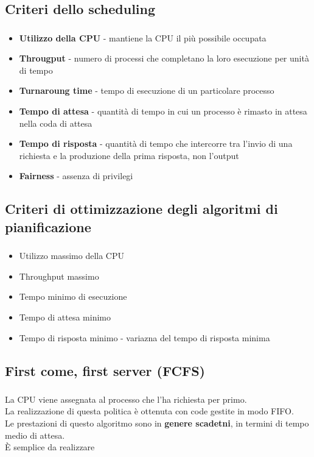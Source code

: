 \documentclass{beamer}
\newenvironment{mainframe}{
	\begin{frame}
		\frametitle{\insertsubsection}
		\framesubtitle{\insertsection}
	}{
	\end{frame}
}
\begin{document}
\subsection{Criteri dello scheduling}
\begin{mainframe}
	\begin{itemize}
		\item \textbf{Utilizzo della CPU} - mantiene la CPU il più possibile occupata
		\item \textbf{Througput} - numero di processi che completano la loro esecuzione per unità di tempo
		\item \textbf{Turnaroung time} - tempo di esecuzione di un particolare processo
		\item \textbf{Tempo di attesa} - quantità di tempo in cui un processo è rimasto in attesa nella coda di attesa
		\item \textbf{Tempo di risposta} - quantità di tempo che intercorre tra l'invio di una richiesta e la produzione della prima risposta, non l'output
		\item \textbf{Fairness} - assenza di privilegi
	\end{itemize}
\end{mainframe}
\subsection{Criteri di ottimizzazione degli algoritmi di pianificazione}
\begin{mainframe}
	\begin{itemize}
		\item Utilizzo massimo della CPU
		\item Throughput massimo
		\item Tempo minimo di esecuzione
		\item Tempo di attesa minimo
		\item Tempo di risposta minimo - variazna del tempo di risposta minima
	\end{itemize}
\end{mainframe}
\subsection{First come, first server (FCFS)}
\begin{mainframe}
	La CPU viene assegnata al processo che l'ha richiesta per primo.\\
	La realizzazione di questa politica è ottenuta con code gestite in modo FIFO.\\
	Le prestazioni di questo algoritmo sono in \textbf{genere scadetni}, in termini di tempo medio di attesa.\\
	È semplice da realizzare
\end{mainframe}
\end{document}
